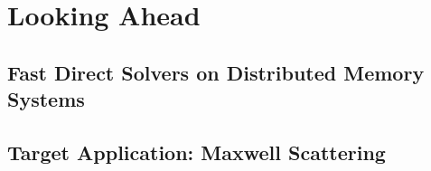 \chapter{Looking Ahead}\label{chpt:3}


\section{Fast Direct Solvers on Distributed Memory Systems}\label{sec:3_1}


% 

\section{Target Application: Maxwell Scattering}\label{sec:3_3}

